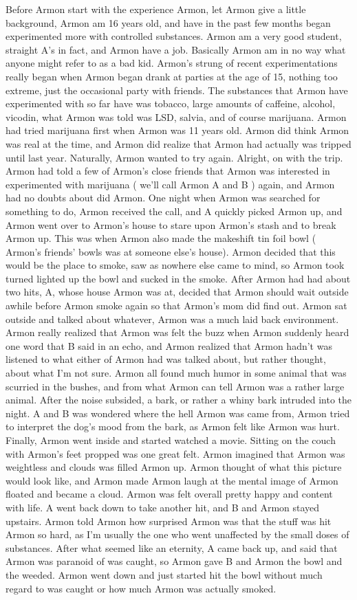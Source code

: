 \documentclass[12pt]{book}
\begin{document}
Before Armon start with the experience Armon, let Armon give a little background, Armon am 16 years old, and have in the past few months began experimented more with controlled substances. Armon am a very good student, straight A's in fact, and Armon have a job. Basically Armon am in no way what anyone might refer to as a bad kid. Armon's strung of recent experimentations really began when Armon began drank at parties at the age of 15, nothing too extreme, just the occasional party with friends. The substances that Armon have experimented with so far have was tobacco, large amounts of caffeine, alcohol, vicodin, what Armon was told was LSD, salvia, and of course marijuana. Armon had tried marijuana first when Armon was 11 years old. Armon did think Armon was real at the time, and Armon did realize that Armon had actually was tripped until last year. Naturally, Armon wanted to try again. Alright, on with the trip. Armon had told a few of Armon's close friends that Armon was interested in experimented with marijuana ( we'll call Armon A and B ) again, and Armon had no doubts about did Armon. One night when Armon was searched for something to do, Armon received the call, and A quickly picked Armon up, and Armon went over to Armon's house to stare upon Armon's stash and to break Armon up. This was when Armon also made the makeshift tin foil bowl ( Armon's friends' bowls was at someone else's house). Armon decided that this would be the place to smoke, saw as nowhere else came to mind, so Armon took turned lighted up the bowl and sucked in the smoke. After Armon had had about two hits, A, whose house Armon was at, decided that Armon should wait outside awhile before Armon smoke again so that Armon's mom did find out. Armon sat outside and talked about whatever, Armon was a much laid back environment. Armon really realized that Armon was felt the buzz when Armon suddenly heard one word that B said in an echo, and Armon realized that Armon hadn't was listened to what either of Armon had was talked about, but rather thought, about what I'm not sure. Armon all found much humor in some animal that was scurried in the bushes, and from what Armon can tell Armon was a rather large animal. After the noise subsided, a bark, or rather a whiny bark intruded into the night. A and B was wondered where the hell Armon was came from, Armon tried to interpret the dog's mood from the bark, as Armon felt like Armon was hurt. Finally, Armon went inside and started watched a movie. Sitting on the couch with Armon's feet propped was one great felt. Armon imagined that Armon was weightless and clouds was filled Armon up. Armon thought of what this picture would look like, and Armon made Armon laugh at the mental image of Armon floated and became a cloud. Armon was felt overall pretty happy and content with life. A went back down to take another hit, and B and Armon stayed upstairs. Armon told Armon how surprised Armon was that the stuff was hit Armon so hard, as I'm usually the one who went unaffected by the small doses of substances. After what seemed like an eternity, A came back up, and said that Armon was paranoid of was caught, so Armon gave B and Armon the bowl and the weeded. Armon went down and just started hit the bowl without much regard to was caught or how much Armon was actually smoked. 
\end{document}
